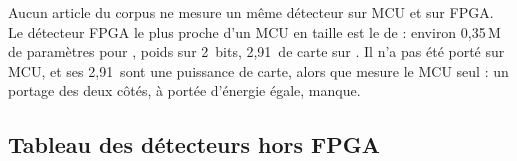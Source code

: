 Aucun article du corpus ne mesure un même détecteur sur MCU et sur FPGA. Le détecteur FPGA
le plus proche d'un MCU en taille est le  de
\citet{arxiv-2609.24757-npu-accelerator-quantized-real-time}\pp{} : environ 0,35\,M de
paramètres pour  , poids sur 2~bits, 2,91\, de carte sur 
 . Il n'a pas été porté sur MCU, et ses 2,91\, sont une puissance de
carte, alors que  mesure le MCU seul : un portage des deux côtés, à portée
d'énergie égale, manque.

\subsection{Tableau des détecteurs hors FPGA}

